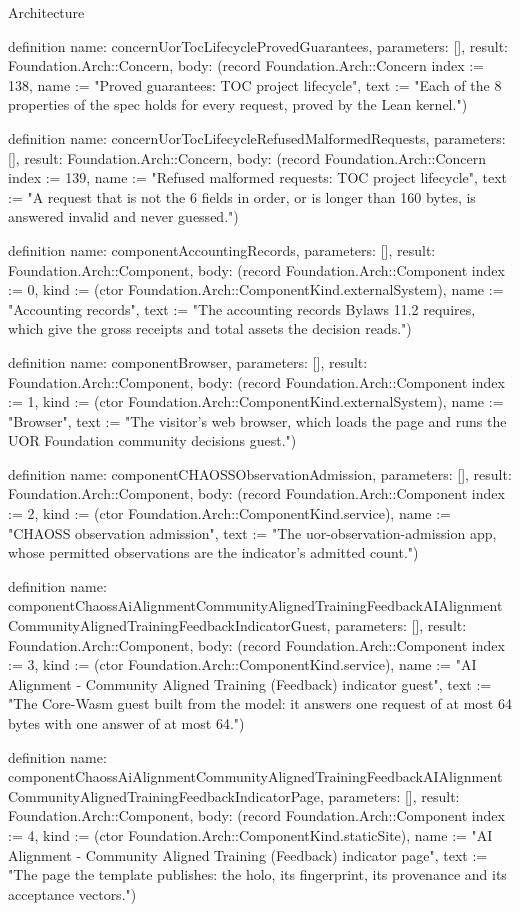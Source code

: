 \begin{lexlean}{Architecture}
\begin{semanticmodule}
definition{
  name: concernUorTocLifecycleProvedGuarantees,
  parameters: [],
  result: Foundation.Arch::Concern,
  body: (record Foundation.Arch::Concern {index := 138, name := "Proved guarantees: TOC project lifecycle", text := "Each of the 8 properties of the spec holds for every request, proved by the Lean kernel."})
}

definition{
  name: concernUorTocLifecycleRefusedMalformedRequests,
  parameters: [],
  result: Foundation.Arch::Concern,
  body: (record Foundation.Arch::Concern {index := 139, name := "Refused malformed requests: TOC project lifecycle", text := "A request that is not the 6 fields in order, or is longer than 160 bytes, is answered invalid and never guessed."})
}

definition{
  name: componentAccountingRecords,
  parameters: [],
  result: Foundation.Arch::Component,
  body: (record Foundation.Arch::Component {index := 0, kind := (ctor Foundation.Arch::ComponentKind.externalSystem), name := "Accounting records", text := "The accounting records Bylaws 11.2 requires, which give the gross receipts and total assets the decision reads."})
}

definition{
  name: componentBrowser,
  parameters: [],
  result: Foundation.Arch::Component,
  body: (record Foundation.Arch::Component {index := 1, kind := (ctor Foundation.Arch::ComponentKind.externalSystem), name := "Browser", text := "The visitor's web browser, which loads the page and runs the UOR Foundation community decisions guest."})
}

definition{
  name: componentCHAOSSObservationAdmission,
  parameters: [],
  result: Foundation.Arch::Component,
  body: (record Foundation.Arch::Component {index := 2, kind := (ctor Foundation.Arch::ComponentKind.service), name := "CHAOSS observation admission", text := "The uor-observation-admission app, whose permitted observations are the indicator's admitted count."})
}

definition{
  name: componentChaossAiAlignmentCommunityAlignedTrainingFeedbackAIAlignmentCommunityAlignedTrainingFeedbackIndicatorGuest,
  parameters: [],
  result: Foundation.Arch::Component,
  body: (record Foundation.Arch::Component {index := 3, kind := (ctor Foundation.Arch::ComponentKind.service), name := "AI Alignment - Community Aligned Training (Feedback) indicator guest", text := "The Core-Wasm guest built from the model: it answers one request of at most 64 bytes with one answer of at most 64."})
}

definition{
  name: componentChaossAiAlignmentCommunityAlignedTrainingFeedbackAIAlignmentCommunityAlignedTrainingFeedbackIndicatorPage,
  parameters: [],
  result: Foundation.Arch::Component,
  body: (record Foundation.Arch::Component {index := 4, kind := (ctor Foundation.Arch::ComponentKind.staticSite), name := "AI Alignment - Community Aligned Training (Feedback) indicator page", text := "The page the template publishes: the holo, its fingerprint, its provenance and its acceptance vectors."})
}


\end{semanticmodule}
\end{lexlean}
